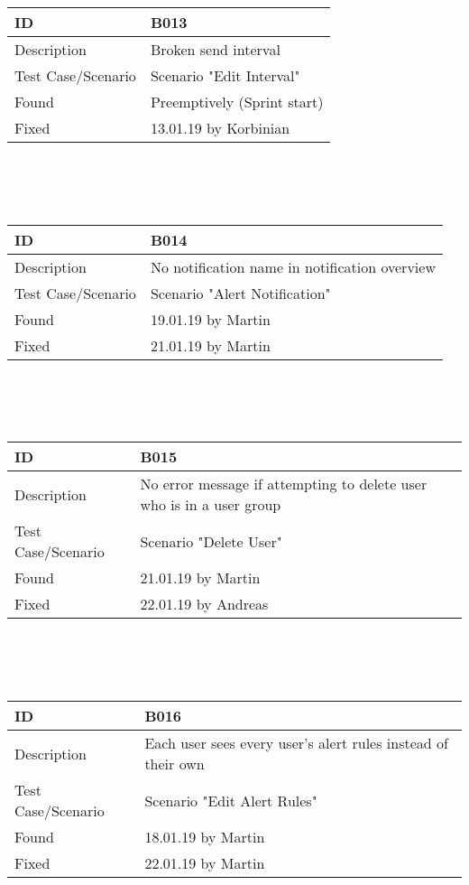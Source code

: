 \documentclass{scrreprt}
\begin{document}
\\ \\ \\
\begin{tabularx}{12cm}{l|X}
ID					& B013  \\
\hline
Description 		& 
Broken send interval \\
\hline
Test Case/Scenario	& Scenario "Edit Interval"\\
\hline
Found				&  	Preemptively (Sprint start)\\
\hline
Fixed				&   13.01.19 by Korbinian \\ 
\end{tabularx}
\\ \\ \\
\begin{tabularx}{12cm}{l|X}
ID					& B014 \\
\hline
Description 		& 
No notification name in notification overview \\
\hline
Test Case/Scenario	&  Scenario "Alert Notification"  \\
\hline
Found				&   19.01.19 by Martin\\
\hline
Fixed				&   21.01.19 by Martin \\ 
\end{tabularx}
\\ \\ \\
\begin{tabularx}{12cm}{l|X}
ID					& B015  \\
\hline
Description 		& 
No error message if attempting to delete user who is in a user group\\
\hline
Test Case/Scenario	& Scenario "Delete User"  \\
\hline
Found				& 21.01.19 by Martin  \\
\hline
Fixed				& 22.01.19 by Andreas \\ 
\end{tabularx}
\\ \\ \\
\begin{tabularx}{12cm}{l|X}
ID					& B016  \\
\hline
Description 		& 
Each user sees every user's alert rules instead of their own\\
\hline
Test Case/Scenario	& Scenario "Edit Alert Rules" \\
\hline
Found				& 18.01.19 by Martin  \\
\hline
Fixed				& 22.01.19 by Martin \\ 
\end{tabularx}
\end{document}
